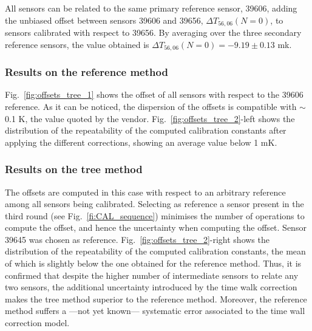 All sensors can be related to the same primary reference sensor, 39606, adding  the unbiased offset between sensors 39606 and 39656,  $\Delta T_{56,06}(N=0)$, to sensors calibrated with respect to 39656. By averaging over the three secondary reference sensors, the value obtained is $\Delta T_{56,06}(N=0)=-9.19\pm0.13$ mk.

\subsubsection{Results on the reference method}
\label{sec:results_reference}
\noindent Fig.~\ref{fig:offsets_tree_1} shows the offset of all sensors with respect to the 39606 reference. As it can be noticed, the dispersion of the offsets is compatible with $\sim$0.1 K, the value quoted by the vendor. Fig.~\ref{fig:offsets_tree_2}-left shows the distribution of the repeatability of the computed calibration constants after applying the different corrections, showing an average value below 1 mK.

\subsubsection{Results on the tree method}
\noindent The offsets are computed in this case with respect to an arbitrary reference among all sensors being calibrated. Selecting as reference a sensor present in the third round (see Fig.~\ref{fi:CAL_sequence}) minimises the number of operations to compute the offset, and hence the uncertainty when computing the offset. Sensor 39645 was chosen as reference. Fig.~\ref{fig:offsets_tree_2}-right shows the distribution of the repeatability of the computed calibration constants, the mean of which is slightly below the one obtained for the reference method. Thus, it is confirmed that despite the higher number of intermediate sensors to relate any two sensors, the additional uncertainty introduced by the time walk correction makes the tree method superior to the reference method. Moreover, the reference method suffers a ---not yet known--- systematic error associated to the time wall correction model. 

